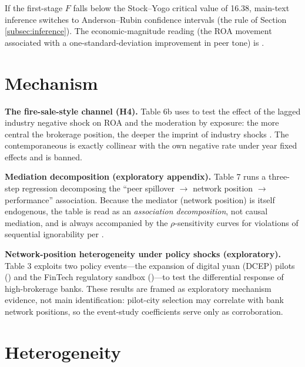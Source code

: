  If
the first-stage $F$ falls below the Stock--Yogo critical value of
16.38, main-text inference switches to Anderson--Rubin confidence
intervals (the rule of Section \ref{subsec:inference}). The
economic-magnitude reading (the ROA movement associated with a
one-standard-deviation improvement in peer tone) is
.

\section{Mechanism}\label{sec:mech}

\textbf{The fire-sale-style channel (H4).} Table 6b uses
 to test the effect of the lagged industry negative
shock  on ROA and the moderation by
 exposure: the more central the
brokerage position, the deeper the imprint of industry shocks
\parencite{duarte2021firesale,han2024brokerage}. The contemporaneous
 is exactly collinear with the own
negative rate under year fixed effects and is banned.

\textbf{Mediation decomposition (exploratory appendix).} Table 7
runs a three-step regression decomposing the ``peer spillover $\to$
network position $\to$ performance'' association. Because the
mediator (network position) is itself endogenous, the table is read
as an \emph{association decomposition}, not causal mediation, and is
always accompanied by the $\rho$-sensitivity curves for violations
of sequential ignorability per \textcite{imai2010identification}.

\textbf{Network-position heterogeneity under policy shocks
(exploratory).} Table 3 exploits two policy events---the expansion
of digital yuan (DCEP) pilots () and the FinTech
regulatory sandbox ()---to test the differential
response of high-brokerage banks. These results are framed as
exploratory mechanism evidence, not main identification: pilot-city
selection may correlate with bank network positions, so the
event-study coefficients serve only as corroboration.

\section{Heterogeneity}\label{sec:het}

